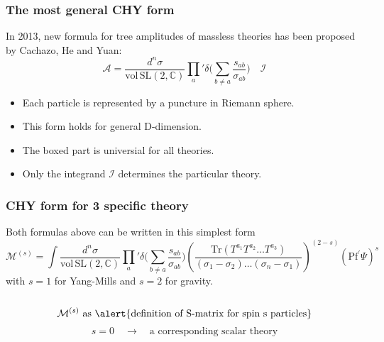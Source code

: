 \documentclass{beamer}
\begin{document}
\begin{frame}
    \frametitle{The most general CHY form}
    In 2013, new formula for tree amplitudes of massless theories has been proposed by Cachazo, He and Yuan:
    \begin{equation*}
        \mathcal{A}=\boxed{\frac{d^n\sigma}{\mathrm{vol\,SL}(2,\mathbb{C})}\prod_a{'}\delta\bigg(\sum_{b\neq a}\frac{s_{ab}}{\sigma_{ab}}\bigg)}\quad \mathcal{I}
    \end{equation*}
    \begin{itemize}
        \item Each particle is represented by a puncture in Riemann sphere.
        \item This form holds for general D-dimension.
        \item The boxed part is \alert{universial for all theories}.
        \item Only the integrand $\mathcal{I}$ determines the particular theory.
    \end{itemize}
\end{frame}
\begin{frame}
    \frametitle{CHY form for 3 specific theory}
    Both formulas above can be written in this simplest form 
    \alert{
        \begin{equation*}
            \!\!\!\!\mathcal{M}^{(s)}\!=\!\!\!\int\frac{d^n\sigma}{\mathrm{vol\,SL}(2,\mathbb{C})}\prod_a{'}\delta\bigg(\sum_{b\neq a}\frac{s_{ab}}{\sigma_{ab}}\bigg)
            \!\!\!\left(\frac{\mathrm{Tr}(T^{a_1}T^{a_2}\dots T^{a_3})}{(\sigma_1-\sigma_2)\dots (\sigma_n-\sigma_1)}\right)^{(2-s)}\!{(\mathrm{Pf}^\prime\Psi)}^s
        \end{equation*}}
    with $s=1$ for Yang-Mills and $s=2$ for gravity.
    \\ \hspace*{\fill}\\
    \pause
    \begin{equation*}
        \mathcal{M}^{(s)} \text{ as \alert{definition of S-matrix for spin s particles}}
    \end{equation*}
    \begin{equation*}
        s=0\quad\to \quad \text{a corresponding scalar theory}
    \end{equation*}
\end{frame}
\end{document}
